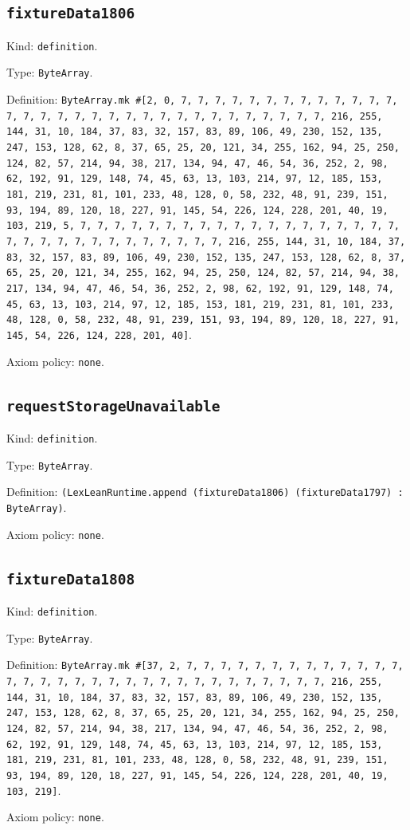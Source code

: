 \documentclass[11pt]{article}
\begin{document}
\subsection*{\texttt{fixtureData1806}}
\noindent Kind: \texttt{definition}.\par
\noindent Type: \texttt{ByteArray}.\par
\noindent Definition: \texttt{ByteArray.mk \#[2, 0, 7, 7, 7, 7, 7, 7, 7, 7, 7, 7, 7, 7, 7, 7, 7, 7, 7, 7, 7, 7, 7, 7, 7, 7, 7, 7, 7, 7, 7, 7, 7, 7, 216, 255, 144, 31, 10, 184, 37, 83, 32, 157, 83, 89, 106, 49, 230, 152, 135, 247, 153, 128, 62, 8, 37, 65, 25, 20, 121, 34, 255, 162, 94, 25, 250, 124, 82, 57, 214, 94, 38, 217, 134, 94, 47, 46, 54, 36, 252, 2, 98, 62, 192, 91, 129, 148, 74, 45, 63, 13, 103, 214, 97, 12, 185, 153, 181, 219, 231, 81, 101, 233, 48, 128, 0, 58, 232, 48, 91, 239, 151, 93, 194, 89, 120, 18, 227, 91, 145, 54, 226, 124, 228, 201, 40, 19, 103, 219, 5, 7, 7, 7, 7, 7, 7, 7, 7, 7, 7, 7, 7, 7, 7, 7, 7, 7, 7, 7, 7, 7, 7, 7, 7, 7, 7, 7, 7, 7, 7, 7, 7, 216, 255, 144, 31, 10, 184, 37, 83, 32, 157, 83, 89, 106, 49, 230, 152, 135, 247, 153, 128, 62, 8, 37, 65, 25, 20, 121, 34, 255, 162, 94, 25, 250, 124, 82, 57, 214, 94, 38, 217, 134, 94, 47, 46, 54, 36, 252, 2, 98, 62, 192, 91, 129, 148, 74, 45, 63, 13, 103, 214, 97, 12, 185, 153, 181, 219, 231, 81, 101, 233, 48, 128, 0, 58, 232, 48, 91, 239, 151, 93, 194, 89, 120, 18, 227, 91, 145, 54, 226, 124, 228, 201, 40]}.\par
\noindent Axiom policy: \texttt{none}.\par
\subsection*{\texttt{requestStorageUnavailable}}
\noindent Kind: \texttt{definition}.\par
\noindent Type: \texttt{ByteArray}.\par
\noindent Definition: \texttt{(LexLeanRuntime.append (fixtureData1806) (fixtureData1797) : ByteArray)}.\par
\noindent Axiom policy: \texttt{none}.\par
\subsection*{\texttt{fixtureData1808}}
\noindent Kind: \texttt{definition}.\par
\noindent Type: \texttt{ByteArray}.\par
\noindent Definition: \texttt{ByteArray.mk \#[37, 2, 7, 7, 7, 7, 7, 7, 7, 7, 7, 7, 7, 7, 7, 7, 7, 7, 7, 7, 7, 7, 7, 7, 7, 7, 7, 7, 7, 7, 7, 7, 7, 7, 216, 255, 144, 31, 10, 184, 37, 83, 32, 157, 83, 89, 106, 49, 230, 152, 135, 247, 153, 128, 62, 8, 37, 65, 25, 20, 121, 34, 255, 162, 94, 25, 250, 124, 82, 57, 214, 94, 38, 217, 134, 94, 47, 46, 54, 36, 252, 2, 98, 62, 192, 91, 129, 148, 74, 45, 63, 13, 103, 214, 97, 12, 185, 153, 181, 219, 231, 81, 101, 233, 48, 128, 0, 58, 232, 48, 91, 239, 151, 93, 194, 89, 120, 18, 227, 91, 145, 54, 226, 124, 228, 201, 40, 19, 103, 219]}.\par
\noindent Axiom policy: \texttt{none}.\par
\end{document}
